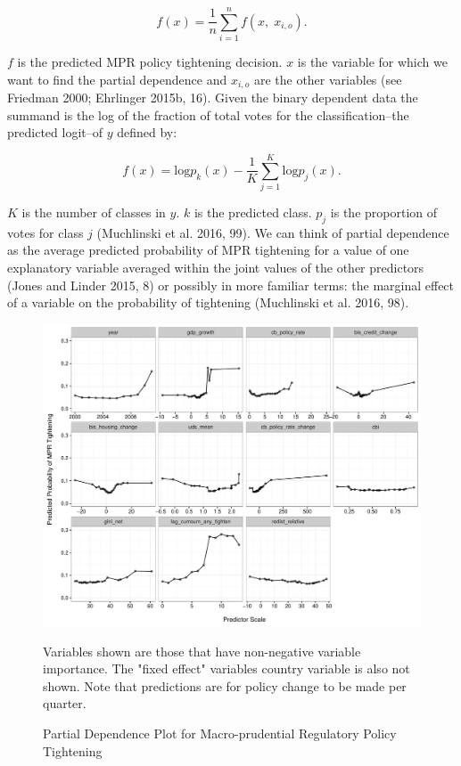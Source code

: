 \documentclass[]{article}
\begin{document}
\begin{equation}
    f(x) = \frac{1}{n}\sum_{i=1}^{n}f(x,\; x_{i,o}).
\end{equation}

\(f\) is the predicted MPR policy tightening decision. \(x\) is the
variable for which we want to find the partial dependence and
\(x_{i,o}\) are the other variables (see Friedman 2000; Ehrlinger 2015b,
16). Given the binary dependent data the summand is the log of the
fraction of total votes for the classification--the predicted logit--of
\(y\) defined by:

\begin{equation}
    f(x) = \mathrm{log}p_{k}(x) - \frac{1}{K}\sum_{j=1}^{K}\mathrm{log}p_{j}(x).
\end{equation}

\(K\) is the number of classes in \(y\). \(k\) is the predicted class.
\(p_{j}\) is the proportion of votes for class \(j\) (Muchlinski et al.
2016, 99). We can think of partial dependence as the average predicted
probability of MPR tightening for a value of one explanatory variable
averaged within the joint values of the other predictors (Jones and
Linder 2015, 8) or possibly in more familiar terms: the marginal effect
of a variable on the probability of tightening (Muchlinski et al. 2016,
98).

\begin{figure}
    \caption{Partial Dependence Plot for Macro-prudential Regulatory Policy Tightening}
    \label{partial_tighten}
    \begin{center}
        \includegraphics{figures/patial_tighten.pdf}
    \end{center}

    {\scriptsize{Variables shown are those that have non-negative variable importance. The "fixed effect" variables country variable is also not shown. Note that predictions are for policy change to be made per quarter.}}

\end{figure}
\end{document}
